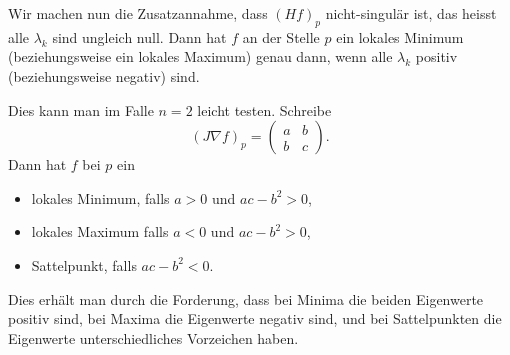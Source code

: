\documentclass[../main.tex]{subfiles}
\begin{document}
Wir machen nun die Zusatzannahme, dass ${(Hf)}_p$ nicht-singulär ist,
das heisst alle $\lambda_k$ sind ungleich null.
Dann hat $f$ an der Stelle $p$ ein lokales Minimum (beziehungsweise
ein lokales Maximum)
genau dann, wenn alle $\lambda_k$ positiv (beziehungsweise negativ) sind.

Dies kann man im Falle $n = 2$ leicht testen. Schreibe
\[
  {(J \nabla f)}_p =
  \begin{pmatrix}
    a & b \\ b & c
  \end{pmatrix}.
\]
Dann hat $f$ bei $p$ ein
\begin{itemize}
  \item lokales Minimum, falls $a > 0$ und $ac - b^2 > 0$,
  \item lokales Maximum falls $a < 0$ und $ac - b^2 > 0$,
  \item Sattelpunkt, falls $ac - b^2 < 0$.
\end{itemize}
Dies erhält man durch die Forderung, dass bei Minima die
beiden Eigenwerte positiv sind, bei Maxima die Eigenwerte
negativ sind, und bei Sattelpunkten die Eigenwerte unterschiedliches
Vorzeichen haben.
\end{document}
